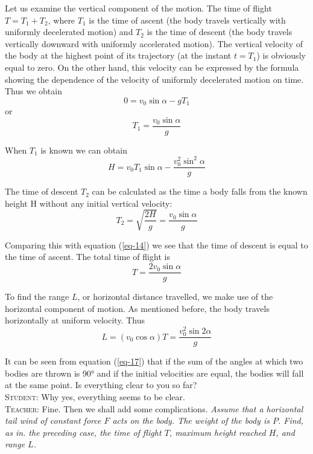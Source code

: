\documentclass[a4paper,sfsidenotes]{tufte-book}
\begin{document}
Let us examine the vertical component of the motion. The time of flight $T= T_{1} +T_{2}$, where $T_{1}$ is the time of ascent (the body travels vertically with uniformly decelerated motion) and $T_{2}$ is the time of descent (the body travels vertically downward with uniformly accelerated motion). The vertical
velocity of the body at the highest point of its trajectory (at the instant $t=T_{1}$) is obviously equal to zero. On the other hand, this velocity can be expressed by the formula showing the dependence of the velocity of uniformly decelerated motion on time. Thus we obtain
$$
0 = v_{0} \sin \alpha - gT_{1}
$$
or
\begin{equation}
T_{1} = \frac{v_{0} \sin \alpha}{g}
\label{eq-14}
\end{equation}

When $T_{1}$ is known we can obtain
\begin{equation}
H = v_{0} T_{1} \sin \alpha -  \frac{v_{0}^{2} \sin^{2} \alpha}{g}
\label{eq-15}
\end{equation}

The time of descent $T_{2}$ can be calculated as the time a body falls from the known height H without any initial vertical velocity:
$$
T_{2} = \sqrt{\frac{2H}{g}} = \frac{v_{0} \sin \alpha}{g}
$$

Comparing this with equation (\ref{eq-14}) we see that the time of
descent is equal to the time of ascent. The total time of flight is
\begin{equation}
T= \frac{2 v_{0} \sin \alpha}{g}
\label{eq-16}
\end{equation}

To find the range $L$, or horizontal distance travelled, we make use of the horizontal component of motion. As mentioned before, the body travels horizontally at uniform velocity. Thus
\begin{equation}
L= (v_{0} \cos \alpha) T = \frac{v_{0}^{2} \sin 2 \alpha}{g}
\label{eq-17}
\end{equation}

It can be seen from equation (\ref{eq-17}) that if the sum of the angles at which two bodies are thrown is \ang{90} and if the initial velocities are equal, the bodies will fall at the same point. Is everything clear to you so far?
\\
\textsc{Student:} Why yes, everything seems to be clear.
\\
\textsc{Teacher:} Fine. Then we shall add some complications. \emph{Assume that a horizontal tail wind of constant force $F$ acts on the body. The weight of the body is $P$. Find, as in. the
preceding case, the time of flight $T$, maximum height reached $H$, and range $L$.}\\
\end{document}
